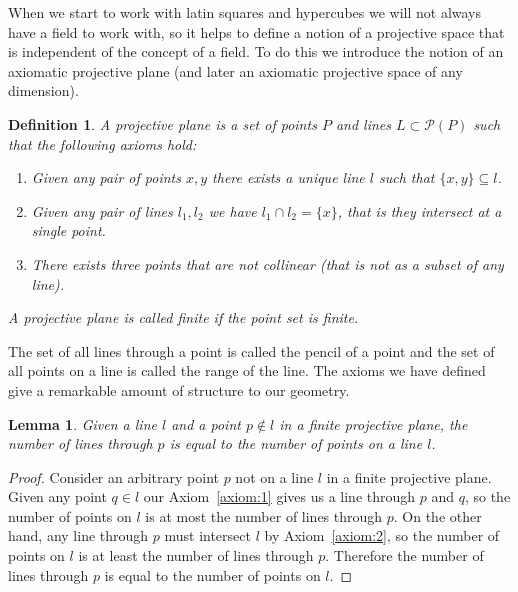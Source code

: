 \documentclass{article}
\newtheorem{lemma}{Lemma}
\newtheorem{definition}{Definition}
\begin{document}
    When we start to work with latin squares and hypercubes we will not always have a field to work with, so it helps to define a notion of a projective space that is independent of the concept of a field. To do this we introduce the notion of an axiomatic projective plane (and later an axiomatic projective space of any dimension).

    \begin{definition}
        A \textit{projective plane} is a set of points \(P\) and lines \(L \subset \mathcal{P}(P)\) such that the following axioms hold:

        \begin{enumerate}[label=Axiom \arabic*.]
            \item Given any pair of points \(x, y\) there exists a unique line \(l\) such that \(\{x, y\} \subseteq l\).\label{axiom:1}
            \item Given any pair of lines \(l_1, l_2\) we have \(l_1 \cap l_2 = \{x\}\), that is they intersect at a single point.\label{axiom:2}
            \item There exists three points that are not collinear (that is not as a subset of any line).\label{axiom:3}
        \end{enumerate}

        A projective plane is called finite if the point set is finite.
      \end{definition}


    The set of all lines through a point is called the pencil of a point and the set of all points on a line is called the range of the line. The axioms we have defined give a remarkable amount of structure to our geometry.
    
    \begin{lemma}
        Given a line \(l\) and a point \(p \notin l\) in a finite projective plane, the number of lines through \(p\) is equal to the number of points on a line \(l\). 
    \end{lemma}
    \begin{proof}
        Consider an arbitrary point \(p\) not on a line \(l\) in a finite projective plane. Given any point \(q \in l\) our Axiom~\ref{axiom:1} gives us a line through \(p\) and \(q\), so the number of points on \(l\) is at most the number of lines through \(p\). On the other hand,
        any line through \(p\) must intersect \(l\) by Axiom~\ref{axiom:2}, so the number of points on \(l\) is at least the number of lines through \(p\). Therefore the number of lines through \(p\) is equal to the number of points on \(l\).
    \end{proof}
\end{document}
